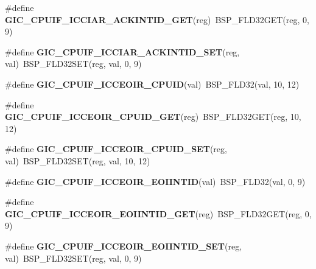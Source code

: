 \begin{DoxyCompactItemize}
\#define {\bfseries G\+I\+C\+\_\+\+C\+P\+U\+I\+F\+\_\+\+I\+C\+C\+I\+A\+R\+\_\+\+A\+C\+K\+I\+N\+T\+I\+D\+\_\+\+G\+ET}(reg)~B\+S\+P\+\_\+\+F\+L\+D32\+G\+ET(reg, 0, 9)
\item 
\mbox{\label{arm-gic-regs_8h_a6906dca95d1b1471e713f3406ed381be}} 
\#define {\bfseries G\+I\+C\+\_\+\+C\+P\+U\+I\+F\+\_\+\+I\+C\+C\+I\+A\+R\+\_\+\+A\+C\+K\+I\+N\+T\+I\+D\+\_\+\+S\+ET}(reg,  val)~B\+S\+P\+\_\+\+F\+L\+D32\+S\+ET(reg, val, 0, 9)
\item 
\mbox{\label{arm-gic-regs_8h_a60c2c5012efe7cf26fe0a9f070102a14}} 
\#define {\bfseries G\+I\+C\+\_\+\+C\+P\+U\+I\+F\+\_\+\+I\+C\+C\+E\+O\+I\+R\+\_\+\+C\+P\+U\+ID}(val)~B\+S\+P\+\_\+\+F\+L\+D32(val, 10, 12)
\item 
\mbox{\label{arm-gic-regs_8h_af2a84dca3dcc5da803f04f3bac2431ff}} 
\#define {\bfseries G\+I\+C\+\_\+\+C\+P\+U\+I\+F\+\_\+\+I\+C\+C\+E\+O\+I\+R\+\_\+\+C\+P\+U\+I\+D\+\_\+\+G\+ET}(reg)~B\+S\+P\+\_\+\+F\+L\+D32\+G\+ET(reg, 10, 12)
\item 
\mbox{\label{arm-gic-regs_8h_aad0fa4670ce75d1edaf43a4d9ddbbb72}} 
\#define {\bfseries G\+I\+C\+\_\+\+C\+P\+U\+I\+F\+\_\+\+I\+C\+C\+E\+O\+I\+R\+\_\+\+C\+P\+U\+I\+D\+\_\+\+S\+ET}(reg,  val)~B\+S\+P\+\_\+\+F\+L\+D32\+S\+ET(reg, val, 10, 12)
\item 
\mbox{\label{arm-gic-regs_8h_ad3940704c99a398226f41750bfa954a4}} 
\#define {\bfseries G\+I\+C\+\_\+\+C\+P\+U\+I\+F\+\_\+\+I\+C\+C\+E\+O\+I\+R\+\_\+\+E\+O\+I\+I\+N\+T\+ID}(val)~B\+S\+P\+\_\+\+F\+L\+D32(val, 0, 9)
\item 
\mbox{\label{arm-gic-regs_8h_a997c66b33c3f5348ff4da99daf4548e7}} 
\#define {\bfseries G\+I\+C\+\_\+\+C\+P\+U\+I\+F\+\_\+\+I\+C\+C\+E\+O\+I\+R\+\_\+\+E\+O\+I\+I\+N\+T\+I\+D\+\_\+\+G\+ET}(reg)~B\+S\+P\+\_\+\+F\+L\+D32\+G\+ET(reg, 0, 9)
\item 
\mbox{\label{arm-gic-regs_8h_a9e01539ed49522f7c164ff546776e1c8}} 
\#define {\bfseries G\+I\+C\+\_\+\+C\+P\+U\+I\+F\+\_\+\+I\+C\+C\+E\+O\+I\+R\+\_\+\+E\+O\+I\+I\+N\+T\+I\+D\+\_\+\+S\+ET}(reg,  val)~B\+S\+P\+\_\+\+F\+L\+D32\+S\+ET(reg, val, 0, 9)
\item 
\mbox{\label{arm-gic-regs_8h_a64b5f6c2f937ffc01da95a34fd5d5d14}} 

\end{DoxyCompactItemize}
